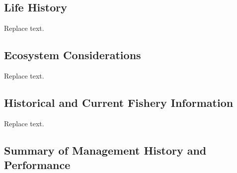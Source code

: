 \documentclass[11pt,
  english,
  a4paper,
]{article}
\begin{document}
\hypertarget{life-history}{%
\subsection{Life History}\label{life-history}}

\leavevmode\tagmcend\tagstructend


Replace text.

\leavevmode\tagmcend\tagstructend\par


\hypertarget{ecosystem-considerations}{%
\subsection{Ecosystem Considerations}\label{ecosystem-considerations}}

\leavevmode\tagmcend\tagstructend


Replace text.

\leavevmode\tagmcend\tagstructend\par


\hypertarget{historical-and-current-fishery-information}{%
\subsection{Historical and Current Fishery Information}\label{historical-and-current-fishery-information}}

\leavevmode\tagmcend\tagstructend


Replace text.

\leavevmode\tagmcend\tagstructend\par


\hypertarget{summary-of-management-history-and-performance}{%
\subsection{Summary of Management History and Performance}\label{summary-of-management-history-and-performance}}

\leavevmode\tagmcend\tagstructend
\end{document}
